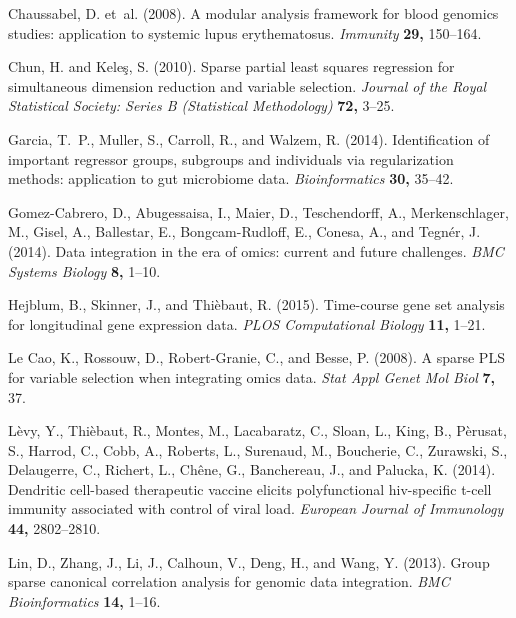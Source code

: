 \documentclass[12pt]{article}
\begin{document}
\begin{description}

\item Chaussabel, D. et~al. (2008).
A modular analysis framework for blood genomics studies: application
  to systemic lupus erythematosus.
\textit{Immunity} {\bf 29,} 150--164.

\item
Chun, H. and Kele\c{s}, S. (2010).
 Sparse partial least squares regression for simultaneous dimension
  reduction and variable selection.
	\textit{Journal of the Royal Statistical Society: Series B (Statistical
  Methodology)} {\bf 72,} 3--25.

\item
Garcia, T.~P., Muller, S., Carroll, R., and Walzem, R. (2014).
 Identification of important regressor groups, subgroups and
  individuals via regularization methods: application to gut microbiome data.
	\textit{Bioinformatics} {\bf 30,} 35--42.

\item
Gomez-Cabrero, D., Abugessaisa, I., Maier, D., Teschendorff, A.,
  Merkenschlager, M., Gisel, A., Ballestar, E., Bongcam-Rudloff, E., Conesa,
  A., and Tegn{\'e}r, J. (2014).
 Data integration in the era of omics: current and future challenges.
	\textit{BMC Systems Biology} {\bf 8,} 1--10.

\item
Hejblum, B., Skinner, J., and Thi\`{e}baut, R. (2015).
 Time-course gene set analysis for longitudinal gene expression data.
	\textit{PLOS Computational Biology} {\bf 11,} 1--21.

\item
{Le Cao}, K., Rossouw, D., Robert-Granie, C., and Besse, P. (2008).
 {A} sparse {P}{L}{S} for variable selection when integrating omics
  data.
	\textit{Stat Appl Genet Mol Biol} {\bf 7,} 37.


\item
L\`{e}vy, Y., Thi\`{e}baut, R., Montes, M., Lacabaratz, C., Sloan, L., King,
  B., P\`{e}rusat, S., Harrod, C., Cobb, A., Roberts, L., Surenaud, M.,
  Boucherie, C., Zurawski, S., Delaugerre, C., Richert, L., Ch\^{e}ne, G.,
  Banchereau, J., and Palucka, K. (2014).
 Dendritic cell-based therapeutic vaccine elicits polyfunctional
  hiv-specific t-cell immunity associated with control of viral load.
	\textit{European Journal of Immunology} {\bf 44,} 2802--2810.

\item
Lin, D., Zhang, J., Li, J., Calhoun, V., Deng, H., and Wang, Y. (2013).
 Group sparse canonical correlation analysis for genomic data
  integration.
	\textit{BMC Bioinformatics} {\bf 14,} 1--16.


\end{description}
\end{document}
